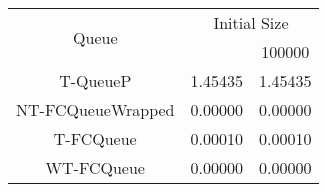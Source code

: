 \begin{tabular}{|c|c|c|}
\hline
\multirow{2}{*}{Queue} & \multicolumn{2}{c|}{Initial Size}\\\cline{2-3}& \qquad 10000 \qquad\quad & 100000\\
\hline
\hline
T-QueueP & 1.45435 & 1.45435\\
NT-FCQueueWrapped & 0.00000 & 0.00000\\
T-FCQueue & 0.00010 & 0.00010\\
WT-FCQueue & 0.00000 & 0.00000\\
\hline\end{tabular}
